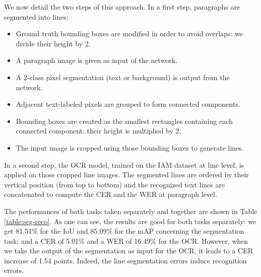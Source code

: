 We now detail the two steps of this approach. In a first step, paragraphs are segmented into lines: 
\begin{itemize}
    \item Ground truth bounding boxes are modified in order to avoid overlaps: we divide their height by 2.
    \item A paragraph image is given as input of the network.
    \item A 2-class pixel segmentation (text or background) is output from the network.
    \item Adjacent text-labeled pixels are grouped to form connected components.
    \item Bounding boxes are created as the smallest rectangles containing each connected component; their height is multiplied by 2.
    \item The input image is cropped using those bounding boxes to generate lines.
\end{itemize}

In a second step, the OCR model, trained on the IAM dataset at line level, is applied on those cropped line images. The segmented lines are ordered by their vertical position (from top to bottom) and the recognized text lines are concatenated to compute the CER and the WER at paragraph level.

The performances of both tasks taken separately and together are shown in Table \ref{table:seg-reco}. As one can see, the results are good for both tasks separately: we get 81.51\% for the  IoU and 85.09\% for the mAP concerning the segmentation task; and a CER of 5.01\% and a WER of 16.49\% for the OCR. 
However, when we take the output of the segmentation as input for the OCR, it leads to a CER increase of 1.54 points. Indeed, the line segmentation errors induce recognition errors.

\begin{table}[!h]
    \caption{Results of the two-step approach on the test set of IAM.}
    \centering
    \label{table:seg-reco}
\end{table}


